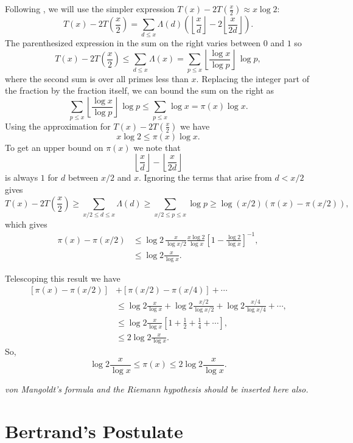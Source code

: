 Following {\DavenportH} \cite{Davenport1981-yr}, we will use the
simpler expression $T(x) - 2 T(\frac{x}{2}) \approx x \log 2$:
\[
T(x) - 2 T(\frac{x}{2}) = 
  \sum_{d\le x} \Lambda(d) \left( \left\lfloor \frac{x}{d}\right\rfloor 
     - 2 \left\lfloor \frac{x}{2d}\right\rfloor \right).
\]
The parenthesized expression in the sum on the right varies between $0$ and $1$
so
\[
T(x) - 2 T(\frac{x}{2}) \le \sum_{d\le x} \Lambda(x)
= \sum_{p \le x} \left\lfloor \frac{\log x}{\log p}\right\rfloor \, \log p,
\]
where the second sum is over all primes less than $x$.  Replacing the
integer part of the fraction by the fraction itself, we can bound the
sum on the right as
\[
\sum_{p \le x} \left\lfloor \frac{\log x}{\log p}\right\rfloor \, \log p
\le \sum_{p \le x} \log x = \pi(x) \log x.
\]
Using  the approximation  for $T(x) - 2
T(\frac{x}{2})$ we have 
\[
x \log 2 \le \pi(x) \log x.
\]
To get an upper bound on $\pi(x)$ we note that 
\[
\left\lfloor \frac{x}{d}\right\rfloor - \left\lfloor \frac{x}{2d}\right\rfloor 
\]
is always $1$ for $d$ between $x/2$ and $x$.  Ignoring the terms that arise
from $d < x/2$ gives
\[
T(x) - 2 T(\frac{x}{2}) \ge \sum_{x/2 \le d \le x} \Lambda(d) 
 \ge \sum_{x/2 \le p \le x} \log p \ge \log(x/2) \left( \pi(x) - \pi(x/2)
\right), 
\]
which gives
\[
\begin{aligned}
\pi(x) - \pi(x/2) & \le \log 2 \, \frac{x}{\log x/2}
\frac{x \log 2}{\log x} \left[ 1 - \frac{\log 2}{\log x}\right]^{-1},\\
& \le \log 2 \frac{x}{\log x}.
\end{aligned}
\]

Telescoping this result we have
\[
\begin{aligned}
\left[\pi(x) - \pi(x/2)\right] &+ 
\left[\pi(x/2) - \pi(x/4)\right] + \cdots \\
& \displaystyle \le \log 2 \frac{x}{\log x} + 
\log2 \frac{x/2}{\log x/2} + \log2 \frac{x/4}{\log x/4} + \cdots, \\
& \le \log 2 \frac{x}{\log x} 
     \left[ 1 + \frac{1}{2} + \frac{1}{4} + \cdots\right], \\
& \le 2 \log 2 \frac{x}{\log x}.
\end{aligned}
\]
So,
\[
\log 2 \frac{x}{\log x} \le \pi(x) \le 2 \log 2 \frac{x}{\log x}.
\]

{\em von Mangoldt's formula and the Riemann hypothesis should be
inserted here also.}

\section{Bertrand's Postulate}
\label{Bertrands:Sec}

